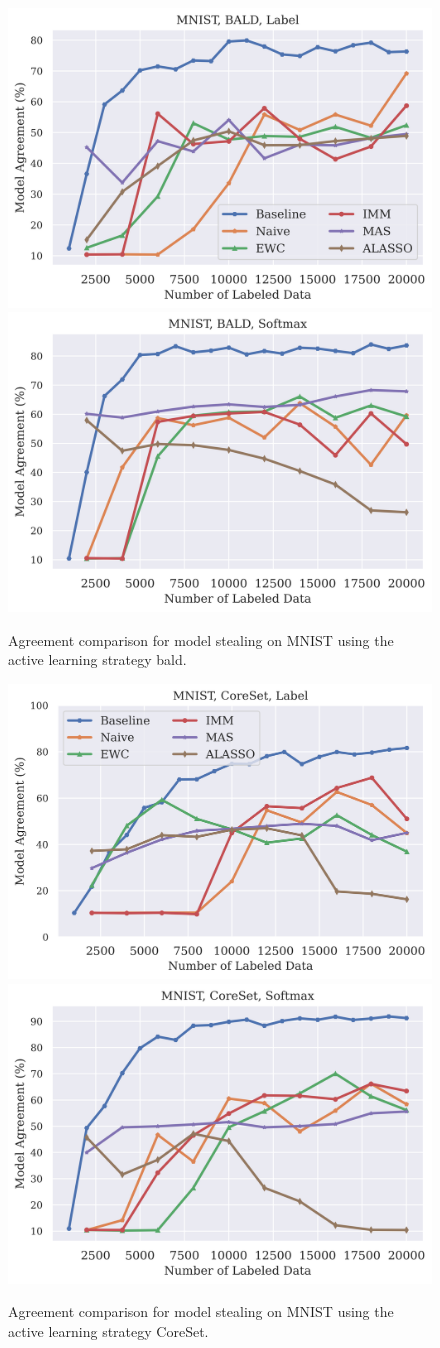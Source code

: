 \begin{figure}[!htb]
    \centering
    \includegraphics[width=0.48\linewidth]{images/results_CALMS/mnist_label_bald.png} \hfill
    \includegraphics[width=0.48\linewidth]{images/results_CALMS/mnist_softmax_bald.png}
    \caption{Agreement comparison for model stealing on MNIST using the active learning strategy \gls{bald}.}
    \label{fig:CALMSMNISTBALD}
\end{figure}

\begin{figure}[!htb]
    \centering
    \includegraphics[width=0.48\linewidth]{images/results_CALMS/mnist_label_coreset.png} \hfill
    \includegraphics[width=0.48\linewidth]{images/results_CALMS/mnist_softmax_coreset.png}
    \caption{Agreement comparison for model stealing on MNIST using the active learning strategy CoreSet.}
    \label{fig:CALMSMNISTCoreSet}
\end{figure}

